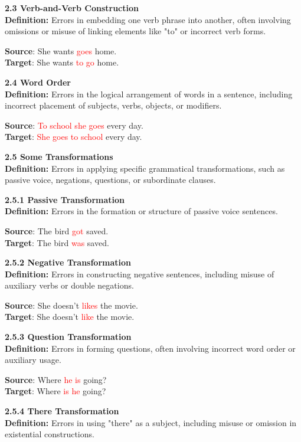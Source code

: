 \begin{tcolorbox}[breakable]
\noindent \textbf{2.3 Verb-and-Verb Construction}\\
\textbf{Definition:} Errors in embedding one verb phrase into another, often involving omissions or misuse of linking elements like "to" or incorrect verb forms.


\textbf{Source}: She wants \textcolor{red}{goes} home. \\
\textbf{Target}: She wants \textcolor{red}{to go} home.


\noindent \textbf{2.4 Word Order}\\
\textbf{Definition:} Errors in the logical arrangement of words in a sentence, including incorrect placement of subjects, verbs, objects, or modifiers.


\textbf{Source}: \textcolor{red}{To school she goes} every day. \\
\textbf{Target}: \textcolor{red}{She goes to school} every day.


\noindent \textbf{2.5 Some Transformations}\\
\textbf{Definition:} Errors in applying specific grammatical transformations, such as passive voice, negations, questions, or subordinate clauses.

\noindent \textbf{2.5.1 Passive Transformation}\\
\textbf{Definition:} Errors in the formation or structure of passive voice sentences.


\textbf{Source}: The bird \textcolor{red}{got} saved. \\
\textbf{Target}: The bird \textcolor{red}{was} saved.


\noindent \textbf{2.5.2 Negative Transformation}\\
\textbf{Definition:} Errors in constructing negative sentences, including misuse of auxiliary verbs or double negations.


\textbf{Source}: She doesn't \textcolor{red}{likes} the movie. \\
\textbf{Target}: She doesn't \textcolor{red}{like} the movie.


\noindent \textbf{2.5.3 Question Transformation}\\
\textbf{Definition:} Errors in forming questions, often involving incorrect word order or auxiliary usage.


\textbf{Source}: Where \textcolor{red}{he is} going? \\
\textbf{Target}: Where \textcolor{red}{is he} going?


\noindent \textbf{2.5.4 There Transformation}\\
\textbf{Definition:} Errors in using "there" as a subject, including misuse or omission in existential constructions.



\end{tcolorbox}
